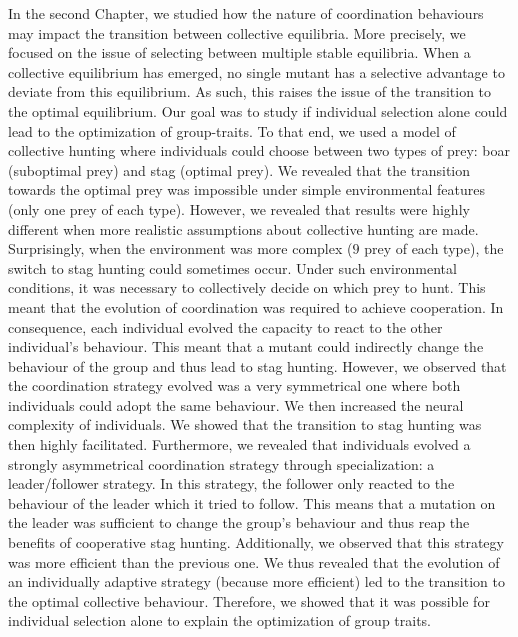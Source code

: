 		In the second Chapter, we studied how the nature of coordination behaviours may impact the transition between collective equilibria. More precisely, we focused on the issue of selecting between multiple stable equilibria. When a collective equilibrium has emerged, no single mutant has a selective advantage to deviate from this equilibrium. As such, this raises the issue of the transition to the optimal equilibrium. Our goal was to study if individual selection alone could lead to the optimization of group-traits. To that end, we used a model of collective hunting where individuals could choose between two types of prey: boar (suboptimal prey) and stag (optimal prey). We revealed that the transition towards the optimal prey was impossible under simple environmental features (only one prey of each type). However, we revealed that results were highly different when more realistic assumptions about collective hunting are made. Surprisingly, when the environment was more complex ($9$ prey of each type), the switch to stag hunting could sometimes occur. Under such environmental conditions, it was necessary to collectively decide on which prey to hunt. This meant that the evolution of coordination was required to achieve cooperation. In consequence, each individual evolved the capacity to react to the other individual's behaviour. This meant that a mutant could indirectly change the behaviour of the group and thus lead to stag hunting. However, we observed that the coordination strategy evolved was a very symmetrical one where both individuals could adopt the same behaviour. We then increased the neural complexity of individuals. We showed that the transition to stag hunting was then highly facilitated. Furthermore, we revealed that individuals evolved a strongly asymmetrical coordination strategy through specialization: a leader/follower strategy. In this strategy, the follower only reacted to the behaviour of the leader which it tried to follow. This means that a mutation on the leader was sufficient to change the group's behaviour and thus reap the benefits of cooperative stag hunting. Additionally, we observed that this strategy was more efficient than the previous one. We thus revealed that the evolution of an individually adaptive strategy (because more efficient) led to the transition to the optimal collective behaviour. Therefore, we showed that it was possible for individual selection alone to explain the optimization of group traits.

